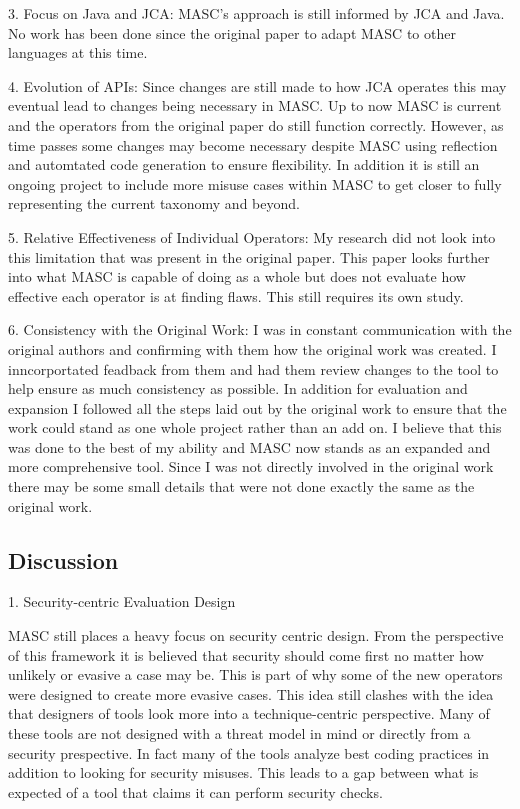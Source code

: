 3. Focus on Java and JCA: MASC's approach is still informed by JCA and Java. No work has been done since the original paper to adapt MASC to other languages at this time.

4. Evolution of APIs: Since changes are still made to how JCA operates this may eventual lead to changes being necessary in MASC. Up to now MASC is current and the operators from the original paper do still function correctly. However, as time passes some changes may become necessary despite MASC using reflection and automtated code generation to ensure flexibility. In addition it is still an ongoing project to include more misuse cases within MASC to get closer to fully representing the current taxonomy and beyond.

5. Relative Effectiveness of Individual Operators: My research did not look into this limitation that was present in the original paper. This paper looks further into what MASC is capable of doing as a whole but does not evaluate how effective each operator is at finding flaws. This still requires its own study.

6. Consistency with the Original Work: I was in constant communication with the original authors and confirming with them how the original work was created. I inncorportated feadback from them and had them review changes to the tool to help ensure as much consistency as possible. In addition for evaluation and expansion I followed all the steps laid out by the original work to ensure that the work could stand as one whole project rather than an add on. I believe that this was done to the best of my ability and MASC now stands as an expanded and more comprehensive tool. Since I was not directly involved in the original work there may be some small details that were not done exactly the same as the original work.

\subsection{Discussion}
\label{ch6:sec:discussion}

1. Security-centric Evaluation Design

MASC still places a heavy focus on security centric design. From the perspective of this framework it is believed that security should come first no matter how unlikely or evasive a case may be. This is part of why some of the new operators were designed to create more evasive cases. This idea still clashes with the idea that designers of tools look more into a technique-centric perspective. Many of these tools are not designed with a threat model in mind or directly from a security prespective. In fact many of the tools analyze best coding practices in addition to looking for security misuses. This leads to a gap between what is expected of a tool that claims it can perform security checks.

